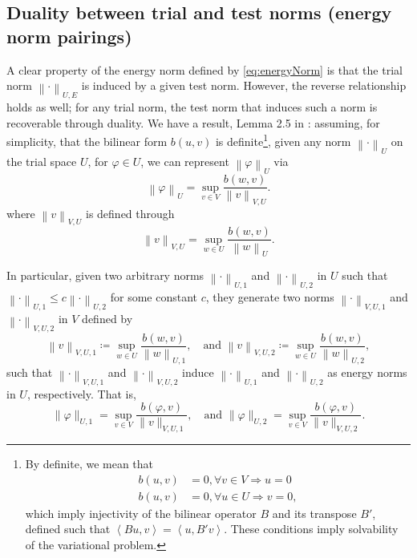 \documentclass[11pt,onecolumn]{scrartcl}
\newcommand{\eqnref}[1]{\eqref{eq:#1}}
\newcommand{\seclab}[1]{\label{sec:#1}}
\newcommand{\nor}[1]{\left\| #1 \right\|}
\newcommand{\LRp}[1]{\left( #1 \right)}
\newcommand{\LRa}[1]{\left\langle #1 \right\rangle}
\begin{document}
\subsection{Duality between trial and test norms (energy norm pairings)}
\seclab{energyPair}
A clear property of the energy norm defined by \eqnref{energyNorm} is that the trial norm $\nor{\cdot}_{U,E}$ is induced by a given test norm. However, the reverse relationship holds as well; for any trial norm, the test norm that induces such a norm is recoverable through duality. We have a result, Lemma 2.5 in \cite{Bui-ThanhDemkowiczGhattas11a}: assuming, for simplicity, that the bilinear form $b(u,v)$ is definite\footnote{By definite, we mean that \begin{align*}b(u,v) &= 0, \forall v\in V \Rightarrow u = 0\\ b(u,v)&=0, \forall u\in U \Rightarrow v = 0,\end{align*}  which imply injectivity of the bilinear operator $B$ and its transpose $B'$, defined such that $\LRa{Bu,v} = \LRa{u,B'v}$.  These conditions imply solvability of the variational problem.}, given any norm $\nor{\cdot}_{U}$ on the trial space $U$, for $\varphi \in U$, we can represent $\nor{\varphi}_{U}$ via
\[
\nor{\varphi}_{U} = \sup_{v \in V}\frac{b\LRp{w,v}}{\nor{v}_{V,U}}.
\]
where $\nor{v}_{V,U}$ is defined through
\[
\nor{v}_{V,U} = \sup_{w \in U}\frac{b\LRp{w,v}}{\nor{w}_{U}}.
\]

In particular, given two arbitrary norms $\nor{\cdot}_{U,1}$ and $\nor{\cdot}_{U,2}$ in $U$
such that $\nor{\cdot}_{U,1} \le c \nor{\cdot}_{U,2}$ for some constant
$c$, they generate two norms $\nor{\cdot}_{V,U,1}$ and
$\nor{\cdot}_{V,U,2}$ in $V$ defined by
\[
\nor{v}_{V,U,1} \coloneqq \sup_{w \in U}\frac{b\LRp{w,v}}{\nor{w}_{U,1}}, \quad
\text{and }\nor{v}_{V,U,2} \coloneqq \sup_{w \in U}\frac{b\LRp{w,v}}{\nor{w}_{U,2}},
\]
such that $\nor{\cdot}_{V,U,1}$ and $\nor{\cdot}_{V,U,2}$ induce
$\nor{\cdot}_{U,1}$ and $\nor{\cdot}_{U,2}$ as energy
norms in $U$, respectively. That is,
\[
\|\varphi\|_{U,1} = \sup_{v\in V}
\frac{b(\varphi,v)}{\|v\|_{V,U,1}}, \quad \text{and }\|\varphi\|_{U,2} = \sup_{v\in V}
\frac{b(\varphi,v)}{\|v\|_{V,U,2}}.
\]
\end{document}
